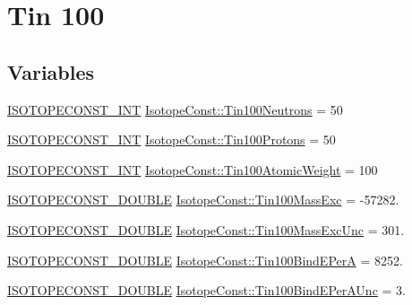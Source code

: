 \hypertarget{group___isotope_const-_tin-_sn100}{}\section{Tin 100}
\label{group___isotope_const-_tin-_sn100}
\subsection*{Variables}
\begin{DoxyCompactItemize}
\item 
\mbox{\hyperlink{group___isotope_const-_macros_ga5f18360b3e99483a35c32d789e62621c}{I\+S\+O\+T\+O\+P\+E\+C\+O\+N\+S\+T\+\_\+\+I\+NT}} \mbox{\hyperlink{group___isotope_const-_tin-_sn100_gac595e806d5e3e970fdd4a3d794399c3f}{Isotope\+Const\+::\+Tin100\+Neutrons}} = 50
\item 
\mbox{\hyperlink{group___isotope_const-_macros_ga5f18360b3e99483a35c32d789e62621c}{I\+S\+O\+T\+O\+P\+E\+C\+O\+N\+S\+T\+\_\+\+I\+NT}} \mbox{\hyperlink{group___isotope_const-_tin-_sn100_ga439c5d2b5fa39079cfbf34f12ed266d5}{Isotope\+Const\+::\+Tin100\+Protons}} = 50
\item 
\mbox{\hyperlink{group___isotope_const-_macros_ga5f18360b3e99483a35c32d789e62621c}{I\+S\+O\+T\+O\+P\+E\+C\+O\+N\+S\+T\+\_\+\+I\+NT}} \mbox{\hyperlink{group___isotope_const-_tin-_sn100_gaad473209914cffb6965190ad5e835182}{Isotope\+Const\+::\+Tin100\+Atomic\+Weight}} = 100
\item 
\mbox{\hyperlink{group___isotope_const-_macros_ga8f45a7272ce02c0b4c65c44636ed719a}{I\+S\+O\+T\+O\+P\+E\+C\+O\+N\+S\+T\+\_\+\+D\+O\+U\+B\+LE}} \mbox{\hyperlink{group___isotope_const-_tin-_sn100_gaea623d4ab0cbc20f58b73012a34fe92c}{Isotope\+Const\+::\+Tin100\+Mass\+Exc}} = -\/57282.
\item 
\mbox{\hyperlink{group___isotope_const-_macros_ga8f45a7272ce02c0b4c65c44636ed719a}{I\+S\+O\+T\+O\+P\+E\+C\+O\+N\+S\+T\+\_\+\+D\+O\+U\+B\+LE}} \mbox{\hyperlink{group___isotope_const-_tin-_sn100_ga2bab755600e22e7a4bf218f29522af24}{Isotope\+Const\+::\+Tin100\+Mass\+Exc\+Unc}} = 301.
\item 
\mbox{\hyperlink{group___isotope_const-_macros_ga8f45a7272ce02c0b4c65c44636ed719a}{I\+S\+O\+T\+O\+P\+E\+C\+O\+N\+S\+T\+\_\+\+D\+O\+U\+B\+LE}} \mbox{\hyperlink{group___isotope_const-_tin-_sn100_ga8947f635cc0394fc2a207687b13bc37c}{Isotope\+Const\+::\+Tin100\+Bind\+E\+PerA}} = 8252.
\item 
\mbox{\hyperlink{group___isotope_const-_macros_ga8f45a7272ce02c0b4c65c44636ed719a}{I\+S\+O\+T\+O\+P\+E\+C\+O\+N\+S\+T\+\_\+\+D\+O\+U\+B\+LE}} \mbox{\hyperlink{group___isotope_const-_tin-_sn100_ga6b4942fe51ba80f3815ff40b0ca7ba62}{Isotope\+Const\+::\+Tin100\+Bind\+E\+Per\+A\+Unc}} = 3.

\end{DoxyCompactItemize}
